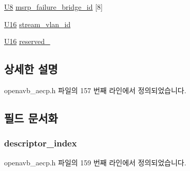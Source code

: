 \begin{DoxyCompactItemize}
\hyperlink{openavb__types__base__pub_8h_aa63ef7b996d5487ce35a5a66601f3e73}{U8} \hyperlink{structopenavb__aecp__response__data__get__stream__info__t_af4f515a13b1ab106e94727f481c3a156}{msrp\+\_\+failure\+\_\+bridge\+\_\+id} \mbox{[}8\mbox{]}
\item 
\hyperlink{openavb__types__base__pub_8h_a0a0a322d5fa4a546d293a77ba8b4a71f}{U16} \hyperlink{structopenavb__aecp__response__data__get__stream__info__t_a31db70d552fc6f5d35875430fca593e6}{stream\+\_\+vlan\+\_\+id}
\item 
\hyperlink{openavb__types__base__pub_8h_a0a0a322d5fa4a546d293a77ba8b4a71f}{U16} \hyperlink{structopenavb__aecp__response__data__get__stream__info__t_a9886e8bdd009966e2d33176310d1d372}{reserved\+\_}
\end{DoxyCompactItemize}


\subsection{상세한 설명}


openavb\+\_\+aecp.\+h 파일의 157 번째 라인에서 정의되었습니다.



\subsection{필드 문서화}
\subsubsection[{\texorpdfstring{descriptor\+\_\+index}{descriptor_index}}]{ descriptor\+\_\+index}\hypertarget{structopenavb__aecp__response__data__get__stream__info__t_ab26fb363c24b9a2a4391f9171c981b08}{}\label{structopenavb__aecp__response__data__get__stream__info__t_ab26fb363c24b9a2a4391f9171c981b08}


openavb\+\_\+aecp.\+h 파일의 159 번째 라인에서 정의되었습니다.

